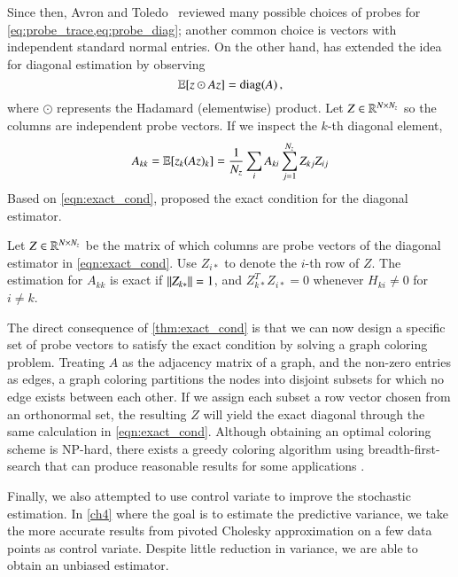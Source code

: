 Since then, Avron and Toledo~\cite{avron2011randomized} reviewed many possible
choices of probes for \cref{eq:probe_trace,eq:probe_diag}; another common choice
is vectors with independent standard normal entries. On the other hand, 
\citet{bekas2007estimator} has extended the idea for diagonal estimation by
observing
\begin{equation}\label{eq:probe_diag}
	\operatorname{\mathbb{E}}[z\odot Az] = \operatorname{diag}(A)\,,
\end{equation}
where $\odot$ represents the Hadamard (elementwise) product. Let $Z\in\mathbb{R}^
{N\mathbin{\times} N_z}$ so the columns are independent probe vectors. If we inspect the
$k$\hyp{}th diagonal element,
\begin{equation}\label{eqn:exact_cond}
	A_{kk} = \operatorname{\mathbb{E}}[z_k(Az)_k] = \frac{1}{N_z}\sum_{i}A_{ki}\sum_{j=1}^{N_z}Z_{kj}Z_
	{ij}
\end{equation}
Based on \cref{eqn:exact_cond}, \citet{bekas2007estimator} proposed the exact
condition for the diagonal estimator.

\begin{theorem}\label{thm:exact_cond}
Let $Z\in\mathbb{R}^{N\times N_z}$ be the matrix of which columns are probe vectors of
the diagonal estimator in \cref{eqn:exact_cond}. Use $Z_{i\ast}$ to denote the
$i$\hyp{}th row of $Z$. The estimation for $A_{kk}$ is exact if $\left\lVert Z_
{k\ast}\right\rVert = 1$, and $Z_{k\ast}^TZ_{i\ast} = 0$ whenever $H_{ki}\neq 0$ for $i\neq
k$.
\end{theorem}

The direct consequence of \cref{thm:exact_cond} is that we can now design a
specific set of probe vectors to satisfy the exact condition by solving a graph
coloring problem. Treating $A$ as the adjacency matrix of a graph, and the
non\hyp{}zero entries as edges, a graph coloring partitions the nodes into
disjoint subsets for which no edge exists between each other. If we assign each
subset a row vector chosen from an orthonormal set, the resulting $Z$ will yield
the exact diagonal through the same calculation in \cref{eqn:exact_cond}.
Although obtaining an optimal coloring scheme is NP\hyp{}hard, there exists a
greedy coloring algorithm using breadth\hyp{}first\hyp{}search that can produce
reasonable results for some applications \cite[Theorem~28.33]
{arumugam2016handbook}.

Finally, we also attempted to use control variate to improve the stochastic
estimation. In \cref{ch4} where the goal is to estimate the predictive variance,
we take the more accurate results from pivoted Cholesky approximation on a few
data points as control variate. Despite little reduction in variance, we
are able to obtain an unbiased estimator.

